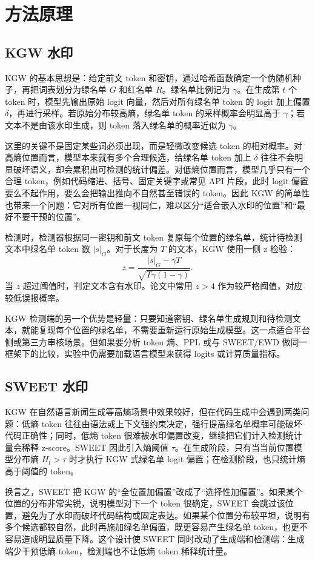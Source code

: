 \documentclass{SYSUReport}
\begin{document}
\section{方法原理}
\subsection{KGW 水印}
KGW 的基本思想是：给定前文 token 和密钥，通过哈希函数确定一个伪随机种子，再把词表划分为绿名单 $G$ 和红名单 $R$。绿名单比例记为 $\gamma$。在生成第 $t$ 个 token 时，模型先输出原始 logit 向量，然后对所有绿名单 token 的 logit 加上偏置 $\delta$，再进行采样。若原始分布较高熵，绿名单 token 的采样概率会明显高于 $\gamma$；若文本不是由该水印生成，则 token 落入绿名单的概率近似为 $\gamma$。

这里的关键不是固定某些词必须出现，而是轻微改变候选 token 的相对概率。对高熵位置而言，模型本来就有多个合理候选，给绿名单 token 加上 $\delta$ 往往不会明显破坏语义，却会累积出可检测的统计偏差。对低熵位置而言，模型几乎只有一个合理 token，例如代码缩进、括号、固定关键字或常见 API 片段，此时 logit 偏置要么不起作用，要么会把输出推向不自然甚至错误的 token。因此 KGW 的简单性也带来一个问题：它对所有位置一视同仁，难以区分“适合嵌入水印的位置”和“最好不要干预的位置”。

检测时，检测器根据同一密钥和前文 token 复原每个位置的绿名单，统计待检测文本中绿名单 token 数 $|s|_G$。对于长度为 $T$ 的文本，KGW 使用一侧 z 检验：
\[
z = \frac{|s|_G - \gamma T}{\sqrt{T\gamma(1-\gamma)}}.
\]
当 $z$ 超过阈值时，判定文本含有水印。论文中常用 $z>4$ 作为较严格阈值，对应较低误报概率。

KGW 检测端的另一个优势是轻量：只要知道密钥、绿名单生成规则和待检测文本，就能复现每个位置的绿名单，不需要重新运行原始生成模型。这一点适合平台侧或第三方审核场景。但如果要分析 token 熵、PPL 或与 SWEET/EWD 做同一框架下的比较，实验中仍需要加载语言模型来获得 logits 或计算质量指标。

\subsection{SWEET 水印}
KGW 在自然语言新闻生成等高熵场景中效果较好，但在代码生成中会遇到两类问题：低熵 token 往往由语法或上下文强约束决定，强行提高绿名单概率可能破坏代码正确性；同时，低熵 token 很难被水印偏置改变，继续把它们计入检测统计量会稀释 z-score。SWEET 因此引入熵阈值 $\tau$。在生成阶段，只有当当前位置模型分布熵 $H_t>\tau$ 时才执行 KGW 式绿名单 logit 偏置；在检测阶段，也只统计熵高于阈值的 token。

换言之，SWEET 把 KGW 的“全位置加偏置”改成了“选择性加偏置”。如果某个位置的分布非常尖锐，说明模型对下一个 token 很确定，SWEET 会跳过该位置，避免为了水印而破坏代码结构或固定表达。如果某个位置分布较平坦，说明有多个候选都较自然，此时再施加绿名单偏置，既更容易产生绿名单 token，也更不容易造成明显质量下降。这个设计使 SWEET 同时改动了生成端和检测端：生成端少干预低熵 token，检测端也不让低熵 token 稀释统计量。
\end{document}
